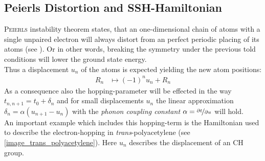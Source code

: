 \subsection{Peierls Distortion and SSH-Hamiltonian}
\label{chapter_Peierls_SSH}
\textsc{Peierls} instability theorem states, that an one-dimensional chain of atoms with a single unpaired electron will always distort from an perfect periodic placing of its atoms (see \cite{chandrasekhar,nalwa}). Or in other words, breaking the symmetry under the previous told conditions will lower the ground state energy.\\
Thus a displacement $u_n$ of the atoms is expected yielding the new atom positions:
\begin{align}
	R_n &\mapsto (-1)^{n}u_n + R_n
\end{align}
As a consequence also the hopping-parameter will be effected in the way $t_{n, n+1} = t_0 + \delta_n$ and for small displacements $u_n$ the linear approximation $\delta_n = \alpha (u_{n+1} - u_n)$ with the \emph{phonon coupling constant} $\alpha = \nicefrac{\partial t}{\partial u}$ will hold.\\
An important example which includes this hopping-term is the Hamiltonian used to describe the electron-hopping in \emph{trans}-polyacetylene (see \cref{image_trans_polyacetylene}). Here $u_n$ describes the displacement of an CH group.\\
